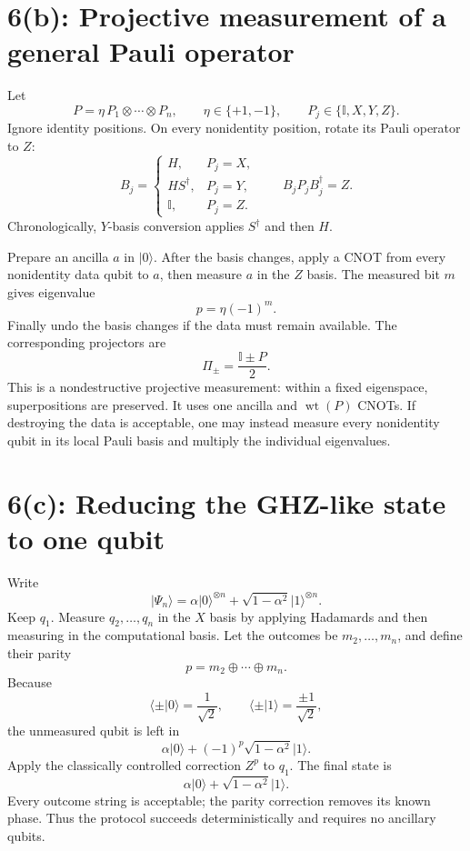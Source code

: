 \documentclass[11pt]{article}
\newcommand{\ket}[1]{\lvert #1\rangle}
\newcommand{\bra}[1]{\langle #1\rvert}
\newcommand{\I}{\mathbb{I}}
\begin{document}
\section*{6(b): Projective measurement of a general Pauli operator}

Let
\[
 P=\eta\,P_1\otimes\cdots\otimes P_n,\qquad
 \eta\in\{+1,-1\},\qquad
 P_j\in\{\I,X,Y,Z\}.
\]
Ignore identity positions. On every nonidentity position, rotate its
Pauli operator to \(Z\):
\[
 B_j=
 \begin{cases}
 H,&P_j=X,\\
 HS^\dagger,&P_j=Y,\\
 \I,&P_j=Z.
 \end{cases}
\qquad
B_jP_jB_j^\dagger=Z.
\]
Chronologically, \(Y\)-basis conversion applies \(S^\dagger\) and then
\(H\).

Prepare an ancilla \(a\) in \(\ket0\). After the basis changes, apply a
CNOT from every nonidentity data qubit to \(a\), then measure \(a\) in
the \(Z\) basis. The measured bit \(m\) gives eigenvalue
\[
 p=\eta(-1)^m.
\]
Finally undo the basis changes if the data must remain available.
The corresponding projectors are
\[
\boxed{\Pi_{\pm}=\frac{\I\pm P}{2}.}
\]
This is a nondestructive projective measurement: within a fixed
eigenspace, superpositions are preserved. It uses one ancilla and
\(\operatorname{wt}(P)\) CNOTs. If destroying the data is acceptable,
one may instead measure every nonidentity qubit in its local Pauli basis
and multiply the individual eigenvalues.

\section*{6(c): Reducing the GHZ-like state to one qubit}

Write
\[
 \ket{\Psi_n}
 =\alpha\ket{0}^{\otimes n}
 +\sqrt{1-\alpha^2}\ket{1}^{\otimes n}.
\]
Keep \(q_1\). Measure \(q_2,\ldots,q_n\) in the \(X\) basis by applying
Hadamards and then measuring in the computational basis. Let the outcomes
be \(m_2,\ldots,m_n\), and define their parity
\[
 p=m_2\oplus\cdots\oplus m_n.
\]
Because
\[
 \bra{\pm}0\rangle=\frac1{\sqrt2},\qquad
 \bra{\pm}1\rangle=\frac{\pm1}{\sqrt2},
\]
the unmeasured qubit is left in
\[
 \alpha\ket0+(-1)^p\sqrt{1-\alpha^2}\ket1.
\]
Apply the classically controlled correction \(Z^p\) to \(q_1\). The
final state is
\[
\boxed{
\alpha\ket0+\sqrt{1-\alpha^2}\ket1.
}
\]
Every outcome string is acceptable; the parity correction removes its
known phase. Thus the protocol succeeds deterministically and requires
no ancillary qubits.
\end{document}
